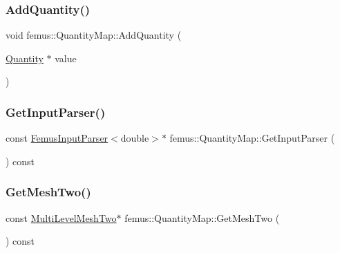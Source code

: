 \subsubsection{\texorpdfstring{Add\+Quantity()}{AddQuantity()}}
{\footnotesize\ttfamily void femus\+::\+Quantity\+Map\+::\+Add\+Quantity (\begin{DoxyParamCaption}\item[{\mbox{\hyperlink{classfemus_1_1_quantity}{Quantity}} $\ast$}]{value }\end{DoxyParamCaption})\hspace{0.3cm}{\ttfamily [inline]}}

\mbox{\label{classfemus_1_1_quantity_map_ae45ce1f62fbaf4c7253231bfdfc2a699}} 
\subsubsection{\texorpdfstring{Get\+Input\+Parser()}{GetInputParser()}}
{\footnotesize\ttfamily const \mbox{\hyperlink{classfemus_1_1_femus_input_parser}{Femus\+Input\+Parser}}$<$double$>$$\ast$ femus\+::\+Quantity\+Map\+::\+Get\+Input\+Parser (\begin{DoxyParamCaption}{ }\end{DoxyParamCaption}) const\hspace{0.3cm}{\ttfamily [inline]}}

\mbox{\label{classfemus_1_1_quantity_map_a1fd0c792179b5eeb087874311cff6635}} 
\subsubsection{\texorpdfstring{Get\+Mesh\+Two()}{GetMeshTwo()}}
{\footnotesize\ttfamily const \mbox{\hyperlink{classfemus_1_1_multi_level_mesh_two}{Multi\+Level\+Mesh\+Two}}$\ast$ femus\+::\+Quantity\+Map\+::\+Get\+Mesh\+Two (\begin{DoxyParamCaption}{ }\end{DoxyParamCaption}) const\hspace{0.3cm}{\ttfamily [inline]}}

